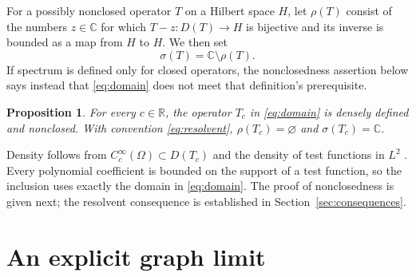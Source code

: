 \documentclass[11pt,a4paper]{article}
\newtheorem{proposition}{Proposition}
\begin{document}
For a possibly nonclosed operator $T$ on a Hilbert space $H$, let
$\rho(T)$ consist of the numbers $z\in\mathbb C$ for which
$T-z:D(T)\to H$ is bijective and its inverse is bounded as a map from $H$
to $H$. We then set
\begin{equation}
 \sigma(T)=\mathbb C\setminus\rho(T).
 \label{eq:resolvent}
\end{equation}
If spectrum is defined only for closed operators, the nonclosedness assertion
below says instead that \eqref{eq:domain} does not meet that definition's
prerequisite.

\begin{proposition}
\label{prop:main}
For every $c\in\mathbb R$, the operator $T_c$ in \eqref{eq:domain} is densely
defined and nonclosed. With convention \eqref{eq:resolvent},
$\rho(T_c)=\varnothing$ and $\sigma(T_c)=\mathbb C$.
\end{proposition}

Density follows from $C_c^\infty(\Omega)\subset D(T_c)$ and the density of test
functions in $L^2$ \cite[Corollary~4.23]{Brezis}. Every polynomial coefficient
is bounded on the support of a test function, so the inclusion uses exactly
the domain in \eqref{eq:domain}. The proof of nonclosedness is given next;
the resolvent consequence is established in Section~\ref{sec:consequences}.

\section{An explicit graph limit}
\label{sec:construction}
\end{document}
